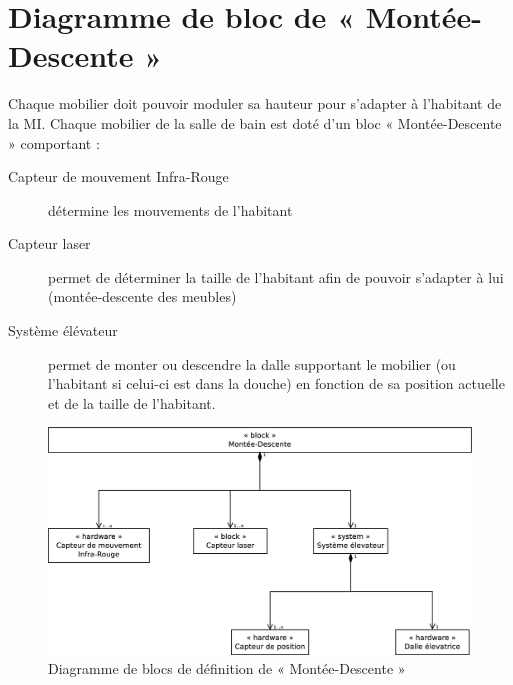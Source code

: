 \section{Diagramme de bloc de « Montée-Descente »}
Chaque mobilier doit pouvoir moduler sa hauteur pour s'adapter à l'habitant de la MI. Chaque mobilier de la salle de bain est doté d'un bloc « Montée-Descente » comportant :
\begin{description}
	\item[Capteur de mouvement Infra-Rouge] détermine les mouvements de l'habitant
	\item[Capteur laser] permet de déterminer la taille de l'habitant afin de pouvoir s'adapter à lui (montée-descente des meubles)
	\item[Système élévateur] permet de monter ou descendre la dalle supportant le mobilier (ou l'habitant si celui-ci est dans la douche) en fonction de sa position actuelle et de la taille de l'habitant.   
\end{description}
\vfill
\begin{figure}[H]
	\centering
	\includegraphics[width=1.0\linewidth]{diagrams/bathroom/diagramme_blocks_bdd2.eps}
	\caption{Diagramme de blocs de définition de « Montée-Descente »}
	\label{fig:diagramme_bdd2}
\end{figure}
\vfill
